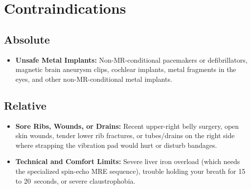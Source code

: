 \section{Contraindications}

\subsection{Absolute}
\begin{itemize}
\item \textbf{Unsafe Metal Implants:} Non-MR-conditional pacemakers or defibrillators, magnetic brain aneurysm clips, cochlear implants, metal fragments in the eyes, and other non-MR-conditional metal implants.
\end{itemize}

\subsection{Relative}
\begin{itemize}
\item \textbf{Sore Ribs, Wounds, or Drains:} Recent upper-right belly surgery, open skin wounds, tender lower rib fractures, or tubes/drains on the right side where strapping the vibration pad would hurt or disturb bandages.
\item \textbf{Technical and Comfort Limits:} Severe liver iron overload (which needs the specialized spin-echo MRE sequence), trouble holding your breath for 15 to 20~seconds, or severe claustrophobia.
\end{itemize}

